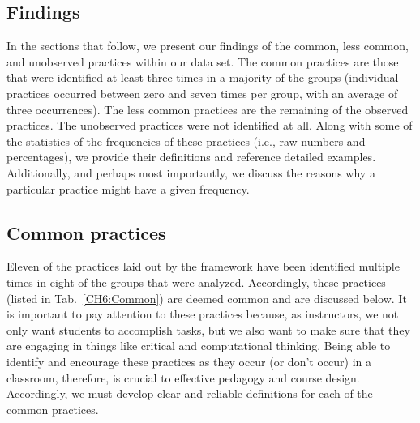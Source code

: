 \documentclass{msuphddissertation}
\begin{document}
\begin{doublespace}
\section{Findings}

In the sections that follow, we present our findings of the common, less common, and unobserved practices within our data set.  The common practices are those that were identified at least three times in a majority of the groups (individual practices occurred between zero and seven times per group, with an average of three occurrences).  The less common practices are the remaining of the observed practices.  The unobserved practices were not identified at all.  Along with some of the statistics of the frequencies of these practices (i.e., raw numbers and percentages), we provide their definitions and reference detailed examples.  Additionally, and perhaps most importantly, we discuss the reasons why a particular practice might have a given frequency.

%
%
%
%
%
%
%
%
%
%
%
%
%
%
%
%

\subsection{Common practices}

Eleven of the practices laid out by the framework have been identified multiple times in eight of the groups that were analyzed.  Accordingly, these practices (listed in Tab.~\ref{CH6:Common}) are deemed common and are discussed below.  It is important to pay attention to these practices because, as instructors, we not only want students to accomplish tasks, but we also want to make sure that they are engaging in things like critical and computational thinking.  Being able to identify and encourage these practices as they occur (or don't occur) in a classroom, therefore, is crucial to effective pedagogy and course design.  Accordingly, we must develop clear and reliable definitions for each of the common practices.


\end{doublespace}
\end{document}
